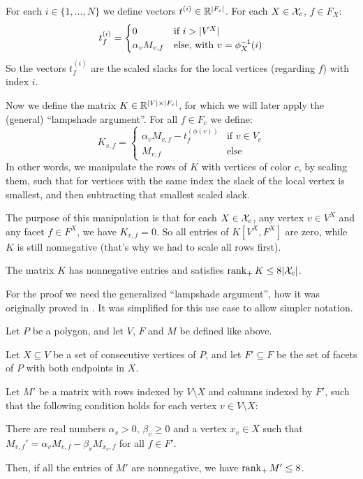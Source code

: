 For each $i \in \{1,\dots,N\}$ we define vectors $t^{(i)} \in \mathbb{R}^{\lvert F_c\rvert}$. For each $X \in \mathcal{X}_c$, $f \in F_X$:
\begin{equation*}
  t_f^{(i)} = 
  \begin{cases}
    0 &\text{if } i > \lvert V^X\rvert\\
    \alpha_v M_{v,f} &\text{else, with } v = \phi_X^{-1}(i)
  \end{cases}
\end{equation*}
So the vectors $t_f^{(i)}$ are the scaled slacks for the local vertices (regarding $f$) with index $i$.

Now we define the matrix $K \in \mathbb{R}^{\lvert V\rvert \times \lvert F_c\rvert}$, for which we will later apply the (general) ``lampshade argument''. For all $f \in F_c$ we define:
\begin{equation*}
  K_{v,f} = 
  \begin{cases}
    \alpha_v M_{v,f} - t_f^{(\phi(v))} & \text{if } v \in V_c\\
    M_{v,f} & \text{else}
  \end{cases}
\end{equation*}
In other words, we manipulate the rows of $K$ with vertices of color $c$, by scaling them, such that for vertices with the same index the slack of the local vertex is smallest, and then subtracting that smallest scaled slack.

The purpose of this manipulation is that for each $X \in \mathcal{X}_c$, any vertex $v \in V^X$ and any facet $f \in F^X$, we have $K_{v,f} = 0$. So all entries of $K[V^X, F^X]$ are zero, while $K$ is still nonnegative (that's why we had to scale all rows first).

\begin{lemma}\label{lemma:rank-of-K}
  The matrix $K$ has nonnegative entries and satisfies $\operatorname{rank}_+ K \leq 8\lvert\mathcal{X}_c\rvert$.
\end{lemma}

For the proof we need the generalized ``lampshade argument'', how it was originally proved in \cite[Lemma 3.1]{shitov2014sublinear}. It was simplified for this use case to allow simpler notation.

\begin{lemma}\label{lemma:shitov-lampshade}
  Let $P$ be a polygon, and let $V$, $F$ and $M$ be defined like above. 
  
  Let $X \subseteq V$ be a set of consecutive vertices of $P$, and let $F' \subseteq F$ be the set of facets of $P$ with both endpoints in $X$.

  Let $M'$ be a matrix with rows indexed by $V\setminus X$ and columns indexed by $F'$, such that the following condition holds for each vertex $v\in V\setminus X$:
  
  There are real numbers $\alpha_v>0$, $\beta_v\geq 0$ and a vertex $x_v\in X$ such that\\
  $M_{v,f}'=\alpha_v M_{v,f}-\beta_v M_{x_v,f}$ for all $f\in F'$.

  Then, if all the entries of $M'$ are nonnegative, we have $\operatorname{rank}_+ M'\le 8$.
\end{lemma}

